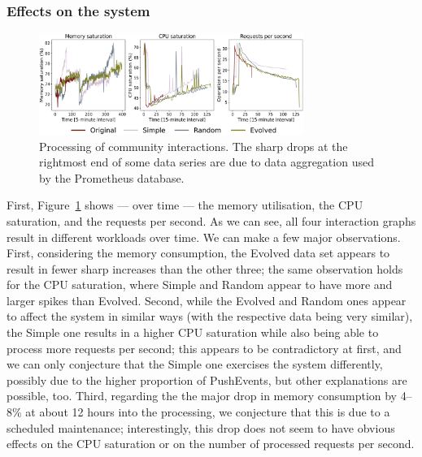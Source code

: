 \documentclass[dvipsnames,format=sigconf,anonymous=False,review=false, balance=false]{acmart}
\begin{document}
\subsubsection{Effects on the system}

\begin{figure}
\centering\vspace{-1mm}%

\includegraphics[height=33mm,width=\linewidth]{processingCommunityInteractionsOVERTIME.png}%
\vspace{-3mm}
\caption{Processing of community interactions. The sharp drops at the rightmost end of some data series are due to data aggregation used by the Prometheus database.}
\label{fig:prometheus}
\end{figure}

First, Figure~\ref{fig:prometheus} shows --- over time --- the memory utilisation, the CPU saturation, and the requests per second. 
As we can see, all four interaction graphs result in different workloads over time. 
We can make a few major observations. 
First, considering the memory consumption, the Evolved data set appears to result in fewer sharp increases than the other three; the same observation holds for the CPU saturation, where Simple and Random appear to have more and larger spikes than Evolved.
Second, while the Evolved and Random ones appear to affect the system in similar ways (with the respective data being very similar), the Simple one results in a higher CPU saturation while also being able to process more requests per second; this appears to be contradictory at first, and we can only conjecture that the Simple one exercises the system differently, possibly due to the higher proportion of PushEvents, but other explanations are possible, too.
Third, regarding the the major drop in memory consumption by 4--8\% at about 12 hours into the processing, we conjecture that this is due to a scheduled maintenance; interestingly, this drop does not seem to have obvious effects on the CPU saturation or on the number of processed requests per second. 
\end{document}
